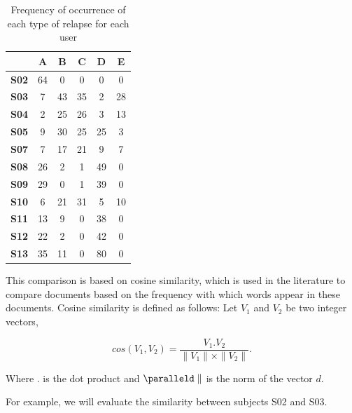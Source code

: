 \begin{table}[h]
\centering
\begin{tabular}{|c|c|c|c|c|c|}
\hline
             & \textbf{A} & \textbf{B} & \textbf{C} & \textbf{D} & \textbf{E} \\ \hline
\textbf{S02} & 64         & 0          & 0          & 0          & 0          \\ \hline
\textbf{S03} & 7          & 43         & 35         & 2          & 28         \\ \hline
\textbf{S04} & 2          & 25         & 26         & 3          & 13         \\ \hline
\textbf{S05} & 9          & 30         & 25         & 25         & 3          \\ \hline
\textbf{S07} & 7          & 17         & 21         & 9          & 7          \\ \hline
\textbf{S08} & 26         & 2          & 1          & 49         & 0          \\ \hline
\textbf{S09} & 29         & 0          & 1          & 39         & 0          \\ \hline
\textbf{S10} & 6          & 21         & 31         & 5          & 10         \\ \hline
\textbf{S11} & 13         & 9          & 0          & 38         & 0          \\ \hline
\textbf{S12}          & 22         & 2          & 0          & 42         & 0          \\ \hline
\textbf{S13}          & 35         & 11         & 0          & 80         & 0          \\ \hline
\end{tabular}
\caption{Frequency of occurrence of each type of relapse for each user}
\label{frequency2}
\end{table}

This comparison is based on cosine similarity, which is used in the literature to compare documents based on the frequency with which words appear in these documents. Cosine similarity is defined as follows: 
Let $V_1$ and $V_2$ be two integer vectors, 


\[
cos(V_{1},V_{2})=\frac{V_{1}. V_{2}}{\parallel V_{1}\parallel\times\parallel V_{2}\parallel}.
\]


Where $.$ is the dot product and $\paralleld\parallel$ is the norm of the vector $d$.



For example, we will evaluate the similarity between subjects S02 and S03.

